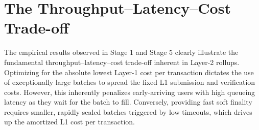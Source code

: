 \section{The Throughput--Latency--Cost Trade-off}
\label{sec:throughput_latency_cost_tradeoff}
The empirical results observed in Stage 1 and Stage 5 clearly illustrate the fundamental throughput--latency--cost trade-off inherent in Layer-2 rollups. Optimizing for the absolute lowest Layer-1 cost per transaction dictates the use of exceptionally large batches to spread the fixed L1 submission and verification costs. However, this inherently penalizes early-arriving users with high queueing latency as they wait for the batch to fill. Conversely, providing fast soft finality requires smaller, rapidly sealed batches triggered by low timeouts, which drives up the amortized L1 cost per transaction.
